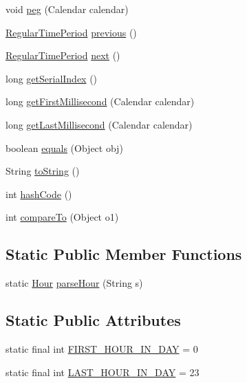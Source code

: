\begin{DoxyCompactItemize}
void \mbox{\hyperlink{classorg_1_1jfree_1_1data_1_1time_1_1_hour_af4edfe009983a54b3747e191fcdb59e6}{peg}} (Calendar calendar)
\item 
\mbox{\hyperlink{classorg_1_1jfree_1_1data_1_1time_1_1_regular_time_period}{Regular\+Time\+Period}} \mbox{\hyperlink{classorg_1_1jfree_1_1data_1_1time_1_1_hour_a13971eb4e9c3744f1a104195b4611105}{previous}} ()
\item 
\mbox{\hyperlink{classorg_1_1jfree_1_1data_1_1time_1_1_regular_time_period}{Regular\+Time\+Period}} \mbox{\hyperlink{classorg_1_1jfree_1_1data_1_1time_1_1_hour_a6307ac2c099c7f333e96684e8e8a510a}{next}} ()
\item 
long \mbox{\hyperlink{classorg_1_1jfree_1_1data_1_1time_1_1_hour_a2666282035106c9e3414eb53dc9a72d4}{get\+Serial\+Index}} ()
\item 
long \mbox{\hyperlink{classorg_1_1jfree_1_1data_1_1time_1_1_hour_ab29f2b42dba98c1b4ee2969b35c2b7d4}{get\+First\+Millisecond}} (Calendar calendar)
\item 
long \mbox{\hyperlink{classorg_1_1jfree_1_1data_1_1time_1_1_hour_a9aa733aa471c73c8246085b08c764acd}{get\+Last\+Millisecond}} (Calendar calendar)
\item 
boolean \mbox{\hyperlink{classorg_1_1jfree_1_1data_1_1time_1_1_hour_a388891cb2789a753133fe9c0fd320025}{equals}} (Object obj)
\item 
String \mbox{\hyperlink{classorg_1_1jfree_1_1data_1_1time_1_1_hour_a880f83edba569567e62d6f35440a81bf}{to\+String}} ()
\item 
int \mbox{\hyperlink{classorg_1_1jfree_1_1data_1_1time_1_1_hour_a633e1439e511138189036c674102ea72}{hash\+Code}} ()
\item 
int \mbox{\hyperlink{classorg_1_1jfree_1_1data_1_1time_1_1_hour_a20136198f69a07feaca6c15be633d33f}{compare\+To}} (Object o1)
\end{DoxyCompactItemize}
\subsection*{Static Public Member Functions}
\begin{DoxyCompactItemize}
\item 
static \mbox{\hyperlink{classorg_1_1jfree_1_1data_1_1time_1_1_hour}{Hour}} \mbox{\hyperlink{classorg_1_1jfree_1_1data_1_1time_1_1_hour_a07afe0ba33b727d0d7d30200c2792681}{parse\+Hour}} (String s)
\end{DoxyCompactItemize}
\subsection*{Static Public Attributes}
\begin{DoxyCompactItemize}
\item 
static final int \mbox{\hyperlink{classorg_1_1jfree_1_1data_1_1time_1_1_hour_a4b924c1afe580d1f5bac0189a59b202b}{F\+I\+R\+S\+T\+\_\+\+H\+O\+U\+R\+\_\+\+I\+N\+\_\+\+D\+AY}} = 0
\item 
static final int \mbox{\hyperlink{classorg_1_1jfree_1_1data_1_1time_1_1_hour_a9ffb1328d0259a7ad771b6dcbc55ae31}{L\+A\+S\+T\+\_\+\+H\+O\+U\+R\+\_\+\+I\+N\+\_\+\+D\+AY}} = 23
\end{DoxyCompactItemize}


